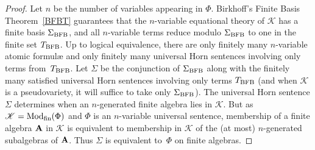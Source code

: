 \documentclass[reqno]{amsart}
\theoremstyle{plain}
\theoremstyle{definition}
\newcommand{\Mod}{\operatorname{Mod}}
\begin{document}
\begin{proof}
Let $n$ be the number of variables appearing in $\Phi$.
Birkhoff's Finite Basis Theorem~\ref{BFBT} guarantees that the $n$-variable equational theory of $\mathscr{K}$ has a finite basis $\Sigma_{\rm BFB}$, and all $n$-variable terms reduce modulo $\Sigma_{\rm BFB}$ to one in the finite set $T_{\rm BFB}$.
Up to logical equivalence, there are only finitely many $n$-variable atomic formul{\ae} and only finitely many universal Horn sentences involving only terms from~$T_{\rm BFB}$.
Let $\Sigma$ be the conjunction of $\Sigma_{\rm BFB}$ along with the finitely many satisfied universal Horn sentences involving only terms $T_{\rm BFB}$ (and when $\mathscr{K}$ is a pseudovariety, it will suffice to take only $\Sigma_{\rm BFB}$).
The universal Horn sentence $\Sigma$ determines when an $n$-generated finite algebra lies in $\mathscr{K}$.
But as $\mathscr{K}=\Mod_{\rm fin}(\Phi)$ and $\Phi$ is an $n$-variable universal sentence, membership of a finite algebra ${\bf A}$ in $\mathscr{K}$ is equivalent to membership in $\mathscr{K}$ of the (at most) $n$-generated subalgebras of ${\bf A}$.
Thus $\Sigma$ is equivalent to~$\Phi$ on finite algebras.
\end{proof}
\end{document}
